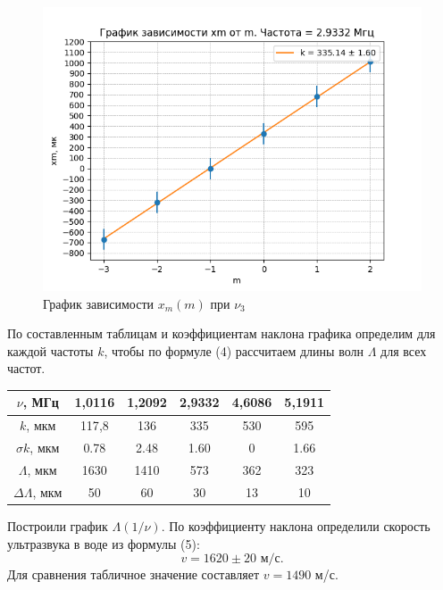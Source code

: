 \documentclass[a4paper,12pt]{article}
\begin{document}
	\begin{figure}[h!]
		\centering	
		\includegraphics[width=1\textwidth]{3.png}
		\caption{График зависимости $x_{m}(m)$ при $\nu_{3}$}
		\label{diff}
	\end{figure}
	По составленным таблицам и коэффициентам наклона графика определим для каждой частоты $k$, чтобы по формуле (4) рассчитаем длины волн $\Lambda$ для всех частот.
	\begin{center}
	    \begin{tabular}{|c|c|c|c|c|c|}
	         \hline
	         $\nu$, МГц & 1,0116 & 1,2092 & 2,9332 & 4{,}6086 & 5{,}1911 \\ \hline
	         $k$, мкм & 117{,}8 & 136 & 335 & 530 & 595 \\ \hline
	         $\sigma k$, мкм &  0.78 & 2.48 & 1.60 & 0 & 1.66 \\ \hline
	         $\Lambda$, мкм & 1630 & 1410 & 573 & 362 & 323 \\ \hline
	         $\Delta\Lambda$, мкм & 50 & 60 & 30 & 13 & 10 \\ \hline
	    \end{tabular}
	\end{center}
	Построили график $\Lambda(1/\nu)$. По коэффициенту наклона определили скорость ультразвука в воде из формулы (5):
	$$v=1620\pm20\text{ м/с}.$$
	Для сравнения табличное значение составляет $v=1490$ м/с.
\end{document}

